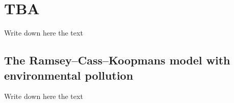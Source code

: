 \section{TBA} \label{Sec:4}
Write down here the text

\subsection{The Ramsey–Cass–Koopmans model with environmental pollution}
Write down here the text

